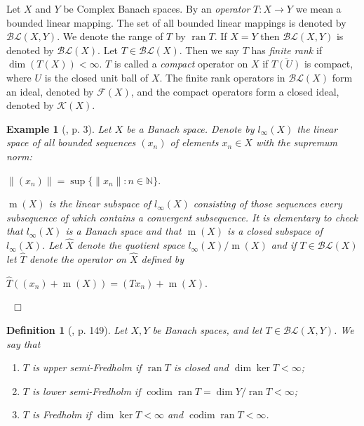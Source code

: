 \documentclass[12pt, oneside]{book}
\newtheorem{example}[theorem]{Example}
\newtheorem{definition}[theorem]{Definition}
\newcommand{\qed}{\hfill ~$\Box$\\}
\def\ker{\operatorname{ker}}
\def\ran{\operatorname{ran}}
\def\dim{\operatorname{dim}}
\def\codim{\operatorname{codim}}
\def\m{\operatorname{m}}
\begin{document}
\noindent Let $X$ and $Y$ be Complex Banach spaces. By an {\sl operator} $T : X \rightarrow Y$ 
we mean a bounded linear mapping. The set of all bounded linear mappings is denoted by 
$\mathcal{BL}(X, Y)$. We denote the range of $T$ by $\ran T$.
\vskip 0.3cm
\noindent If $X = Y$ then $\mathcal{BL}(X,Y)$ is denoted by $\mathcal{BL}(X)$. 
\vskip 0.3cm
\noindent Let $T \in \mathcal{BL}(X)$. Then we say $T$ has {\sl finite rank} if $\dim (T(X)) < \infty.$
$T$ is called a {\sl compact} operator on $X$ if $\overline{T(U)}$ is compact, where $U$ is the 
closed unit ball of $X$. The finite rank operators in $\mathcal{BL}(X)$ form an ideal, denoted by 
$\mathcal{F}(X)$, and the compact operators form a closed ideal, denoted by $\mathcal{K}(X)$.
\vskip 0.3cm
\begin{example} [\cite{BMSW}, p. 3]
\normalfont Let $X$ be a Banach space. Denote by $l_{\infty}(X)$ the linear space of all bounded
sequences $(x_n)$ of elements $x_n \in X$ with the supremum norm:
\begin{center}
$\|(x_n)\| = \sup \{\|x_n\| : n \in \mathbb{N} \}.$
\end{center}
\noindent $\m(X)$ is the linear subspace of $l_{\infty}(X)$ consisting of those sequences 
every subsequence of which contains a convergent subsequence. It is elementary to check that 
$l_{\infty}(X)$ is a Banach space and that $\m(X)$ is a closed subspace of $l_{\infty}(X)$. 
\vskip 0.3cm
\noindent Let $\hat{X}$ denote the quotient space $l_{\infty}(X) / \m(X)$ and if $T \in \mathcal{BL}(X)$
let $\hat{T}$ denote the operator on $\hat{X}$ defined by
\begin{center}
$\hat{T} ((x_n) + \m(X)) = (Tx_n) + \m(X).$
\end{center}
\qed
\end{example}
\begin{definition} [\cite{Muller}, p. 149]
\normalfont
\noindent Let $X, Y$ be Banach spaces, and let $T \in \mathcal{BL}(X, Y)$. We say that
\begin{enumerate}[label=(\alph*)]
\item $T$ is {\sl upper semi-Fredholm} if $\ran T$ is closed and $\dim \ker T < \infty$;
\item $T$ is {\sl lower semi-Fredholm} if $\codim \ran T = \dim Y/ \ran T < \infty$;
\item $T$ is {\sl Fredholm} if $\dim \ker T < \infty$ and $\codim \ran T < \infty$.
\end{enumerate} 
\end{definition}
\end{document}
